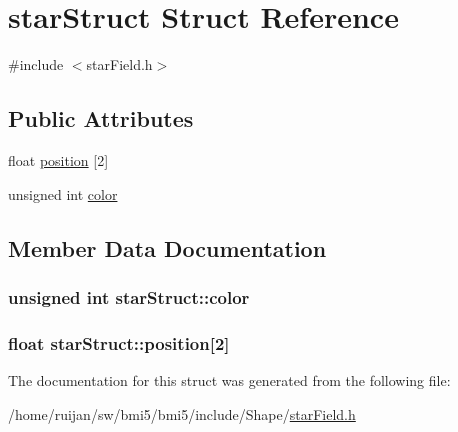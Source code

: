 \hypertarget{structstarStruct}{\section{star\-Struct Struct Reference}
\label{structstarStruct}
}


{\ttfamily \#include $<$star\-Field.\-h$>$}

\subsection*{Public Attributes}
\begin{DoxyCompactItemize}
\item 
float \hyperlink{structstarStruct_a76fdef62c69afe1a7014a757e0edb8f1}{position} \mbox{[}2\mbox{]}
\item 
unsigned int \hyperlink{structstarStruct_a9a62faf17da68e7cac83c2b898e21a90}{color}
\end{DoxyCompactItemize}


\subsection{Member Data Documentation}
\hypertarget{structstarStruct_a9a62faf17da68e7cac83c2b898e21a90}{
\subsubsection[{color}]{\setlength{\rightskip}{0pt plus 5cm}unsigned int star\-Struct\-::color}}\label{structstarStruct_a9a62faf17da68e7cac83c2b898e21a90}
\hypertarget{structstarStruct_a76fdef62c69afe1a7014a757e0edb8f1}{
\subsubsection[{position}]{\setlength{\rightskip}{0pt plus 5cm}float star\-Struct\-::position\mbox{[}2\mbox{]}}}\label{structstarStruct_a76fdef62c69afe1a7014a757e0edb8f1}


The documentation for this struct was generated from the following file\-:\begin{DoxyCompactItemize}
\item 
/home/ruijan/sw/bmi5/bmi5/include/\-Shape/\hyperlink{starField_8h}{star\-Field.\-h}\end{DoxyCompactItemize}
